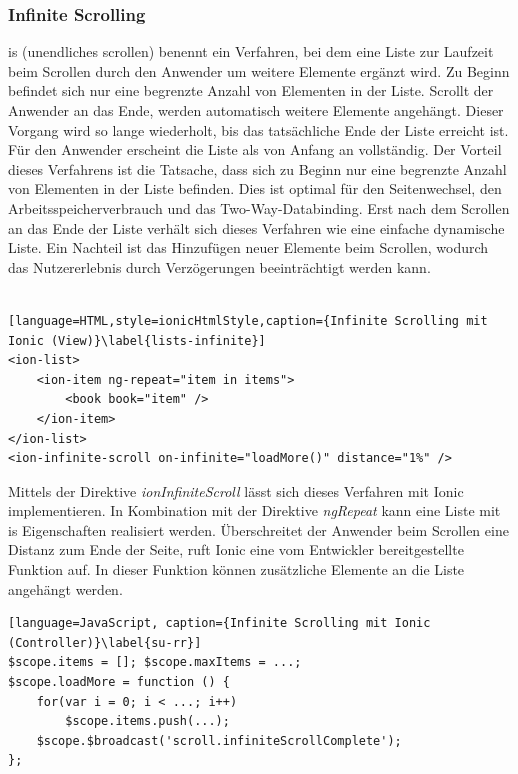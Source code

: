 \subsubsection{Infinite Scrolling}
\gls{is} (\glqq unendliches scrollen\grqq) benennt ein Verfahren, bei dem eine Liste zur Laufzeit beim Scrollen durch den Anwender um weitere Elemente ergänzt wird. Zu Beginn befindet sich nur eine begrenzte Anzahl von Elementen in der Liste. Scrollt der Anwender an das Ende, werden automatisch weitere Elemente angehängt. Dieser Vorgang wird so lange wiederholt, bis das tatsächliche Ende der Liste erreicht ist. Für den Anwender erscheint die Liste als von Anfang an vollständig. Der Vorteil dieses Verfahrens ist die Tatsache, dass sich zu Beginn nur eine begrenzte Anzahl von Elementen in der Liste befinden. Dies ist optimal für den Seitenwechsel, den Arbeitsspeicherverbrauch und das Two-Way-Databinding. Erst nach dem Scrollen an das Ende der Liste verhält sich dieses Verfahren wie eine einfache dynamische Liste. Ein Nachteil ist das Hinzufügen neuer Elemente beim Scrollen, wodurch das Nutzererlebnis durch Verzögerungen beeinträchtigt werden kann.\\\\
\begin{lstlisting}[language=HTML,style=ionicHtmlStyle,caption={Infinite Scrolling mit Ionic (View)}\label{lists-infinite}]
<ion-list>
	<ion-item ng-repeat="item in items">
		<book book="item" />
	</ion-item>
</ion-list>
<ion-infinite-scroll on-infinite="loadMore()" distance="1%" />
\end{lstlisting}
Mittels der Direktive \emph{ionInfiniteScroll} lässt sich dieses Verfahren mit Ionic implementieren. In Kombination mit der Direktive \emph{ngRepeat} kann eine Liste mit \gls{is} Eigenschaften realisiert werden. Überschreitet der Anwender beim Scrollen eine Distanz zum Ende der Seite, ruft Ionic eine vom Entwickler bereitgestellte Funktion auf. In dieser Funktion können zusätzliche Elemente an die Liste angehängt werden. 
\begin{lstlisting}[language=JavaScript, caption={Infinite Scrolling mit Ionic (Controller)}\label{su-rr}]
$scope.items = []; $scope.maxItems = ...;
$scope.loadMore = function () {
	for(var i = 0; i < ...; i++)
		$scope.items.push(...);
	$scope.$broadcast('scroll.infiniteScrollComplete');
};
\end{lstlisting}


